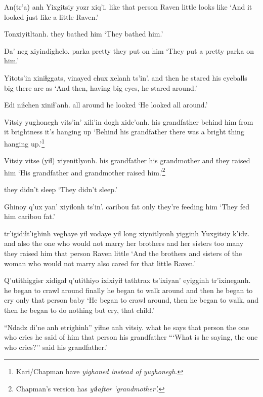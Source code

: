 \documentclass[12pt]{article}
\begin{document}
\gll An(tr'a) anh  Yixgitsiy yozr xiq'i.
like {that person} Raven  little {looks like}
\glt `And it looked just like a little Raven.'
\glend

\gll Tonxiyitltanh.
{{they bathed him}}
\glt `They bathed him.'
\glend

\gll Da' neg xiyindighelo.
parka pretty {they put on him}
\glt `They put a pretty parka on him.'
\glend

\gll Yitots'in xiniɬggats, vinayed chux xelanh ts'in'.
{and then} {he stared} {his eyeballs} big {there are} as
\glt `And then, having big eyes, he stared around.'
\glend

\gll Edi niɬchen xiniɬ'anh.
all around {he looked}
\glt `He looked all around.'
\glend

\gll Vitsiy yughonegh  vits'in' xili'in  {dogh xide'onh.}
{his grandfather} {behind him} {from it} brightness {it's hanging up}
\glt `Behind his grandfather there was a bright thing hanging up.'\footnote{Kari/Chapman have \em yighoned \em instead of \em yughonegh.}
\glend

\gll Vitsiy   vitse (yiɬ)  xiyenitlyonh.
{his grandfather} {his grandmother} and {they raised him}
\glt `His grandfather and grandmother raised him.'\footnote{Chapman's version has \em yiɬ\em after `grandmother'.}
\glend

{{they didn't sleep}}
\glt `They didn't sleep.'
\glend

\gll Ghinoy q'ux yan' xiyiɬonh ts'in'.
caribou  fat only {they're feeding him}
\glt `They fed him caribou fat.'
\glend

 tr'igidiɬt'ighinh   veghaye yiɬ vodaye yiɬ long xiynitlyonh  yigginh Yuxgitsiy k'idz.
{and also} {the one who would not marry} {her brothers} and {her sisters} too many {they raised him} {that person} Raven  little
\glt `And the brothers and sisters of the woman who would not marry also cared for that little Raven.'
\glend

\gll Q'utithiggisr   xidigaɬ  q'utithiyo  ixixiyiɬ tathtrax  ts'ixiyan' eyigginh tr'ixineganh.
{he began to crawl around} finally {he began to walk around} {and then} {he began to cry} only {that person} baby
\glt `He began to crawl around, then he began to walk, and then he began to do nothing but cry, that child.'
\glend

\gll ``Ndadz di'ne anh etrighinh'' yiɬne anh vitsiy.
what {he says} {that person} {the one who cries} {he said of him} {that person} {his grandfather}
\glt ```What is he saying, the one who cries?'' said his grandfather.'
\glend
\end{document}
